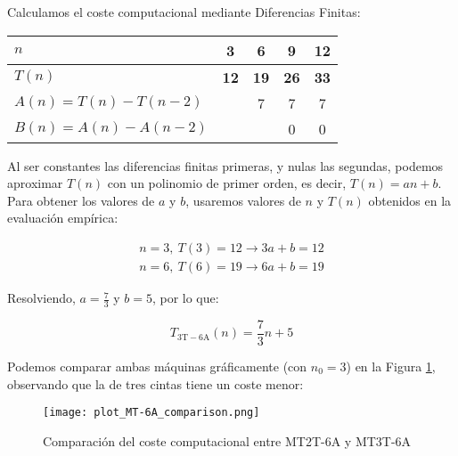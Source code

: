 Calculamos el coste computacional mediante Diferencias Finitas:

\begin{table}[H]
    \centering
    \begin{tabular}{|l|c|c|c|c|}
        \hline
        $n$    & \textbf{3}  & \textbf{6}  & \textbf{9}  & \textbf{12} \\ \hline
        $T(n)$ & \textbf{12} & \textbf{19} & \textbf{26} & \textbf{33} \\ \hline
        \hline
        $A(n) = T(n) - T(n-2)$ &   & 7 & 7 & 7 \\ \hline
        $B(n) = A(n) - A(n-2)$ &   &   & 0 & 0 \\ \hline
    \end{tabular}
\end{table}

Al ser constantes las diferencias finitas primeras, y nulas las segundas, podemos aproximar $T(n)$ con un polinomio de primer orden, es decir, $T(n) = an + b$.\\

Para obtener los valores de $a$ y $b$, usaremos valores de $n$ y $T(n)$ obtenidos en la evaluación empírica:

\begin{subequations}
    \begin{gather}
        n = 3,\ T(3) = 12 \rightarrow 3a + b = 12 \\
        n = 6,\ T(6) = 19 \rightarrow 6a + b = 19
    \end{gather}
\end{subequations}

Resolviendo, $a=\frac{7}{3}$ y $b=5$, por lo que:

\begin{equation}
    T_{\mathrm{3T-6A}}(n) = \frac{7}{3}n + 5
\end{equation}

Podemos comparar ambas máquinas gráficamente (con $n_0 = 3$) en la Figura \ref{fig:MT-6A}, observando que la de tres cintas tiene un coste menor:

\begin{figure}[H]
    \centering
    \texttt{[image: plot\_MT-6A\_comparison.png]}
    \caption{Comparación del coste computacional entre MT2T-6A y MT3T-6A}
    \label{fig:MT-6A}
\end{figure}




